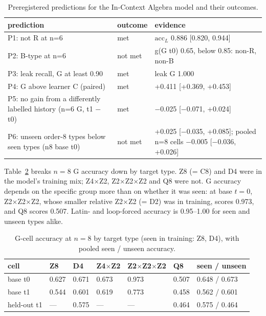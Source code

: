 \documentclass[11pt]{article}
\begin{document}
\begin{table}[tbp]
\centering
\small
\caption{Preregistered predictions for the In-Context Algebra model and their outcomes.}\label{tab:app-ica-pred}
\begin{tabularx}{\linewidth}{@{}>{\raggedright\arraybackslash\hsize=1.4307\hsize}X>{\raggedright\arraybackslash\hsize=0.2730\hsize}X>{\raggedright\arraybackslash\hsize=1.2963\hsize}X@{}}
\toprule
prediction & outcome & evidence \\
\midrule
P1: not R at n=6 & met & $\mathrm{acc}_L$ 0.886 [0.820, 0.944] \\
P2: B-type at n=6 & not met & g(G t0) 0.65, below 0.85: non-R, non-B \\
P3: leak recall, G at least 0.90 & met & leak G 1.000 \\
P4: G above learner C (paired) & met & +0.411 [+0.369, +0.453] \\
P5: no gain from a differently labelled history (n=6 G, t1 $-$ t0) & met & $-$0.025 [$-$0.071, +0.024] \\
P6: unseen order-8 types below seen types (n8 base t0) & not met & +0.025 [$-$0.035, +0.085]; pooled n=8 cells $-$0.005 [$-$0.036, +0.026] \\
\bottomrule
\end{tabularx}
\end{table}

Table~\ref{tab:app-ica-n8} breaks $n = 8$ G accuracy down by target type. Z8 (= C8) and D4 were in the model's training mix; Z4$\times$Z2, Z2$\times$Z2$\times$Z2 and Q8 were not. G accuracy depends on the specific group more than on whether it was seen: at base $t = 0$, Z2$\times$Z2$\times$Z2, whose smaller relative Z2$\times$Z2 (= D2) was in training, scores 0.973, and Q8 scores 0.507. Latin- and loop-forced accuracy is 0.95--1.00 for seen and unseen types alike.

\begin{table}[tbp]
\centering
\small
\caption{G-cell accuracy at $n = 8$ by target type (seen in training: Z8, D4), with pooled seen / unseen accuracy.}\label{tab:app-ica-n8}
\begin{tabular}{@{}lllllll@{}}
\toprule
cell & Z8 & D4 & Z4$\times$Z2 & Z2$\times$Z2$\times$Z2 & Q8 & seen / unseen \\
\midrule
base t0 & 0.627 & 0.671 & 0.673 & 0.973 & 0.507 & 0.648 / 0.673 \\
base t1 & 0.544 & 0.601 & 0.619 & 0.773 & 0.458 & 0.562 / 0.601 \\
held-out t1 & --- & 0.575 & --- & --- & 0.464 & 0.575 / 0.464 \\
\bottomrule
\end{tabular}
\end{table}
\end{document}
